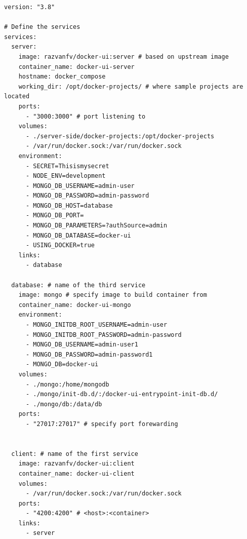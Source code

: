 \documentclass[multi, tikz, a4paper, oneside]{article}
\begin{document}
\begin{lstlisting}[language=docker-compose-2,caption={Deployment to Docker Hub},breaklines=true,label={code:compose}]
version: "3.8"

# Define the services
services:
  server:
    image: razvanfv/docker-ui:server # based on upstream image
    container_name: docker-ui-server
    hostname: docker_compose
    working_dir: /opt/docker-projects/ # where sample projects are located
    ports:
      - "3000:3000" # port listening to
    volumes:
      - ./server-side/docker-projects:/opt/docker-projects
      - /var/run/docker.sock:/var/run/docker.sock
    environment:
      - SECRET=Thisismysecret
      - NODE_ENV=development
      - MONGO_DB_USERNAME=admin-user
      - MONGO_DB_PASSWORD=admin-password
      - MONGO_DB_HOST=database
      - MONGO_DB_PORT=
      - MONGO_DB_PARAMETERS=?authSource=admin
      - MONGO_DB_DATABASE=docker-ui
      - USING_DOCKER=true
    links:
      - database

  database: # name of the third service
    image: mongo # specify image to build container from
    container_name: docker-ui-mongo
    environment:
      - MONGO_INITDB_ROOT_USERNAME=admin-user
      - MONGO_INITDB_ROOT_PASSWORD=admin-password
      - MONGO_DB_USERNAME=admin-user1
      - MONGO_DB_PASSWORD=admin-password1
      - MONGO_DB=docker-ui
    volumes:
      - ./mongo:/home/mongodb
      - ./mongo/init-db.d/:/docker-ui-entrypoint-init-db.d/
      - ./mongo/db:/data/db
    ports:
      - "27017:27017" # specify port forewarding


  client: # name of the first service
    image: razvanfv/docker-ui:client
    container_name: docker-ui-client
    volumes:
      - /var/run/docker.sock:/var/run/docker.sock
    ports:
      - "4200:4200" # <host>:<container>
    links:
      - server

\end{lstlisting}
\end{document}
